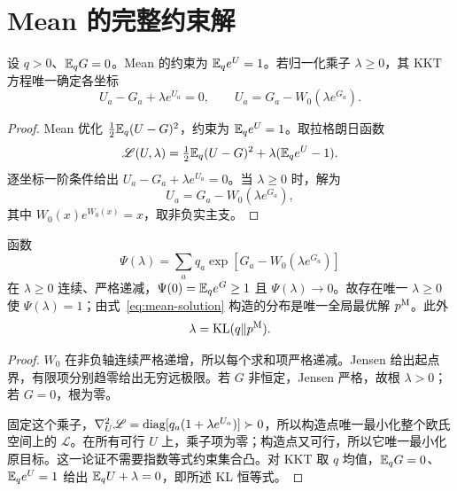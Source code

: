 \section{Mean 的完整约束解}
\begin{lemma}
设 $q>0$、$\mathbb E_qG=0$。Mean 的约束为 $\mathbb E_qe^U=1$。若归一化乘子 $\lambda\ge0$，其 KKT 方程唯一确定各坐标
\begin{equation}
U_a-G_a+\lambda e^{U_a}=0,\qquad U_a=G_a-W_0(\lambda e^{G_a}).
\end{equation}
\end{lemma}
\begin{proof}
Mean 优化 $\frac12\mathbb E_q(U-G)^2$，约束为 $\mathbb E_qe^U=1$。取拉格朗日函数
\begin{equation}
\mathscr L(U,\lambda)=\tfrac12\mathbb E_q(U-G)^2+\lambda(\mathbb E_qe^U-1).
\end{equation}
逐坐标一阶条件给出 $U_a-G_a+\lambda e^{U_a}=0$。当 $\lambda\ge0$ 时，解为
\begin{equation}
U_a=G_a-W_0(\lambda e^{G_a}),
\label{eq:mean-solution}
\end{equation}
其中 $W_0(x)e^{W_0(x)}=x$，取非负实主支。
\end{proof}

\begin{theorem}
函数
\begin{equation}
\Psi(\lambda)=\sum_aq_a\exp[G_a-W_0(\lambda e^{G_a})]
\end{equation}
在 $\lambda\ge0$ 连续、严格递减，$\Psi(0)=\mathbb E_qe^G\ge1$ 且 $\Psi(\lambda)\to0$。故存在唯一 $\lambda\ge0$ 使 $\Psi(\lambda)=1$；由式~\eqref{eq:mean-solution} 构造的分布是唯一全局最优解 $p^{\rm M}$。此外
\begin{equation}
\lambda=\operatorname{KL}(q\Vert p^{\rm M}).
\end{equation}
\end{theorem}
\begin{proof}
$W_0$ 在非负轴连续严格递增，所以每个求和项严格递减。Jensen 给出起点界，有限项分别趋零给出无穷远极限。若 $G$ 非恒定，Jensen 严格，故根 $\lambda>0$；若 $G=0$，根为零。

固定这个乘子，$\nabla_U^2\mathscr L=\operatorname{diag}[q_a(1+\lambda e^{U_a})]\succ0$，所以构造点唯一最小化整个欧氏空间上的 $\mathscr L$。在所有可行 $U$ 上，乘子项为零；构造点又可行，所以它唯一最小化原目标。这一论证不需要指数等式约束集合凸。对 KKT 取 $q$ 均值，$\mathbb E_qG=0$、$\mathbb E_qe^U=1$ 给出 $\mathbb E_qU+\lambda=0$，即所述 KL 恒等式。
\end{proof}

